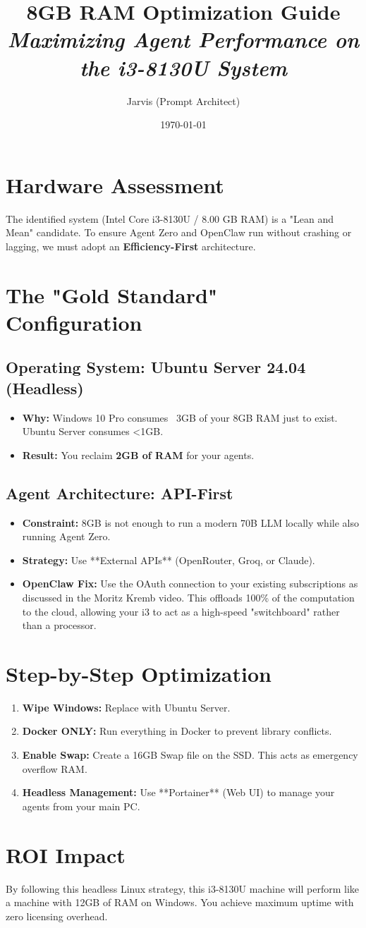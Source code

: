 \documentclass{article}
\title{\LARGE \textbf{\textcolor{primary}{8GB RAM Optimization Guide}} \\ \large \textit{Maximizing Agent Performance on the i3-8130U System}}
\author{Jarvis (Prompt Architect)}
\date{\today}
\begin{document}
\maketitle

\section{Hardware Assessment}
The identified system (Intel Core i3-8130U / 8.00 GB RAM) is a "Lean and Mean" candidate. To ensure Agent Zero and OpenClaw run without crashing or lagging, we must adopt an \textbf{Efficiency-First} architecture.

\section{The "Gold Standard" Configuration}
\subsection{Operating System: Ubuntu Server 24.04 (Headless)}
\begin{itemize}
    \item \textbf{Why:} Windows 10 Pro consumes ~3GB of your 8GB RAM just to exist. Ubuntu Server consumes <1GB. 
    \item \textbf{Result:} You reclaim \textbf{2GB of RAM} for your agents.
\end{itemize}

\subsection{Agent Architecture: API-First}
\begin{itemize}
    \item \textbf{Constraint:} 8GB is not enough to run a modern 70B LLM locally while also running Agent Zero.
    \item \textbf{Strategy:} Use **External APIs** (OpenRouter, Groq, or Claude).
    \item \textbf{OpenClaw Fix:} Use the OAuth connection to your existing subscriptions as discussed in the Moritz Kremb video. This offloads 100\% of the computation to the cloud, allowing your i3 to act as a high-speed "switchboard" rather than a processor.
\end{itemize}

\section{Step-by-Step Optimization}
\begin{enumerate}
    \item \textbf{Wipe Windows:} Replace with Ubuntu Server.
    \item \textbf{Docker ONLY:} Run everything in Docker to prevent library conflicts. 
    \item \textbf{Enable Swap:} Create a 16GB Swap file on the SSD. This acts as emergency overflow RAM.
    \item \textbf{Headless Management:} Use **Portainer** (Web UI) to manage your agents from your main PC.
\end{enumerate}

\section{ROI Impact}
By following this headless Linux strategy, this i3-8130U machine will perform like a machine with 12GB of RAM on Windows. You achieve maximum uptime with zero licensing overhead.
\end{document}
